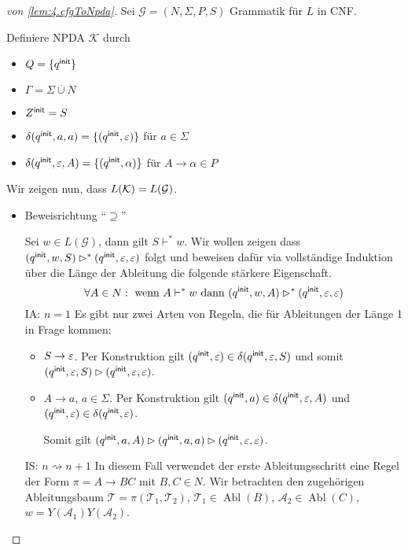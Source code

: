   
\begin{proof}[von \autoref{lem:4.cfgToNpda}]
Sei $\mathcal{G} = (N,\Sigma,P,S)$ Grammatik für $L$ in \ac{CNF}.
    
                Definiere \ac{NPDA} $\mathcal{K}$ durch
                \begin{itemize}
                        \item $Q = \{q^\mathsf{init}\}$ 
                        \item $\Gamma = \Sigma\overset.\cup N$
                        \item $Z^\mathsf{init} = S$
                        \item $\delta(q^\mathsf{init},a,a) = \{(q^\mathsf{init},\varepsilon)\} $ für $ a\in\Sigma$
                        \item $\delta(q^\mathsf{init},\varepsilon,A) = \{(q^\mathsf{init},\alpha)\}$ für $A\to\alpha\in P$
                \end{itemize}
Wir zeigen nun, dass $L(\mathcal{K}) = L(\mathcal{G})$.
\begin{itemize}
 \item Beweisrichtung ``$\supseteq$''
 
 Sei $w\in L(\mathcal{G})$, dann gilt $S\vdash^* w$.
 Wir wollen zeigen dass $(q^\mathsf{init}, w, S) \rhd^* (q^\mathsf{init}, \varepsilon, \varepsilon)$ folgt und beweisen dafür via vollständige Induktion über die Länge der Ableitung die folgende stärkere Eigenschaft.
     \begin{displaymath}
      \forall A \in N: \text{ wenn } A \vdash^* w\text{ dann } (q^\mathsf{init}, w, A) \rhd^* (q^\mathsf{init}, \varepsilon, \varepsilon)
    \end{displaymath}
  IA: $n=1$ Es gibt nur zwei Arten von Regeln, die für Ableitungen der Länge 1 in Frage kommen:
  \begin{itemize}
        \item $S \to \varepsilon$.
        Per Konstruktion gilt $(q^\mathsf{init}, \varepsilon) \in \delta(q^\mathsf{init}, \varepsilon, S)$ und somit $(q^\mathsf{init}, \varepsilon, S) \rhd (q^\mathsf{init}, \varepsilon, \varepsilon)$.
      \item $A \to a$, $a \in \Sigma$.
        Per Konstruktion gilt $(q^\mathsf{init}, a) \in \delta(q^\mathsf{init}, \varepsilon, A)$ und $(q^\mathsf{init}, \varepsilon) \in \delta(q^\mathsf{init}, \varepsilon)$.

        Somit gilt $(q^\mathsf{init}, a, A) \rhd (q^\mathsf{init}, a, a) \rhd (q^\mathsf{init}, \varepsilon, \varepsilon)$.
   \end{itemize}
   
   IS: $n\rightsquigarrow n+1$ In diesem Fall verwendet der erste Ableitungsschritt eine Regel der Form $\pi = A \to BC$ mit $B,C \in N$.
   Wir betrachten den zugehörigen Ableitungsbaum $\mathcal{T} = \pi(\mathcal{T}_1, \mathcal{T}_2)$, $\mathcal{T}_1 \in \operatorname{Abl}(B)$, $\mathcal{A}_2 \in \operatorname{Abl}(C)$, $w = Y(\mathcal{A}_1)Y(\mathcal{A}_2)$.


\end{itemize}
\end{proof}
